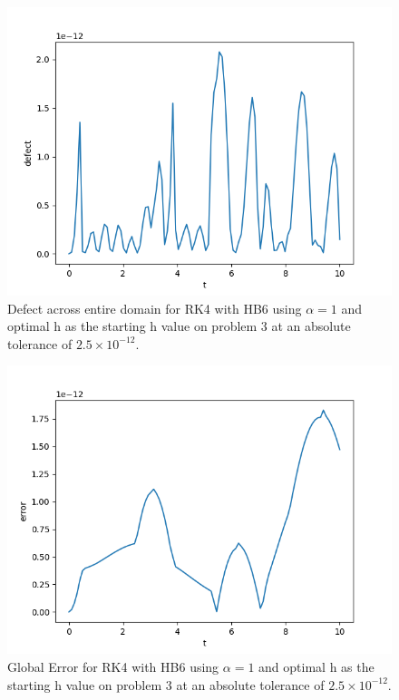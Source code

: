 \begin{figure}[H]
\centering
\includegraphics[width=0.7\linewidth]{./figures/sharp_tolerance_rk4_with_hb6_p3_global_defect}
\caption{Defect across entire domain for RK4 with HB6 using $\alpha = 1$ and optimal h as the starting h value on problem 3 at an absolute tolerance of $2.5 \times 10^{-12}$.}
\label{fig:sharp_tolerance_rk4_with_hb6_p3_global_defect}
\end{figure}

\begin{figure}[H]
\centering
\includegraphics[width=0.7\linewidth]{./figures/sharp_tolerance_rk4_with_hb6_p3_global_error}
\caption{Global Error for RK4 with HB6 using $\alpha = 1$ and optimal h as the starting h value on problem 3 at an absolute tolerance of $2.5 \times 10^{-12}$.}
\label{fig:sharp_tolerance_rk4_with_hb6_p3_global_error}
\end{figure}

